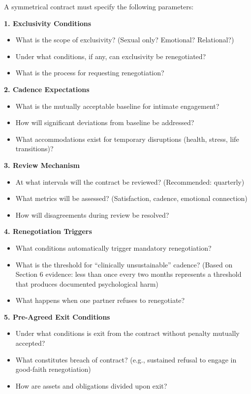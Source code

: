 \documentclass[12pt,openany]{book}
\numberwithin{equation}{chapter}
\begin{document}
A symmetrical contract must specify the following parameters:

\textbf{1. Exclusivity Conditions}
\begin{itemize}
    \item What is the scope of exclusivity? (Sexual only? Emotional? Relational?)
    \item Under what conditions, if any, can exclusivity be renegotiated?
    \item What is the process for requesting renegotiation?
\end{itemize}

\textbf{2. Cadence Expectations}
\begin{itemize}
    \item What is the mutually acceptable baseline for intimate engagement?
    \item How will significant deviations from baseline be addressed?
    \item What accommodations exist for temporary disruptions (health, stress, life transitions)?
\end{itemize}

\textbf{3. Review Mechanism}
\begin{itemize}
    \item At what intervals will the contract be reviewed? (Recommended: quarterly)
    \item What metrics will be assessed? (Satisfaction, cadence, emotional connection)
    \item How will disagreements during review be resolved?
\end{itemize}

\textbf{4. Renegotiation Triggers}
\begin{itemize}
    \item What conditions automatically trigger mandatory renegotiation?
    \item What is the threshold for ``clinically unsustainable'' cadence? (Based on Section 6 evidence: less than once every two months represents a threshold that produces documented psychological harm)
    \item What happens when one partner refuses to renegotiate?
\end{itemize}

\textbf{5. Pre-Agreed Exit Conditions}
\begin{itemize}
    \item Under what conditions is exit from the contract without penalty mutually accepted?
    \item What constitutes breach of contract? (e.g., sustained refusal to engage in good-faith renegotiation)
    \item How are assets and obligations divided upon exit?
\end{itemize}
\end{document}
